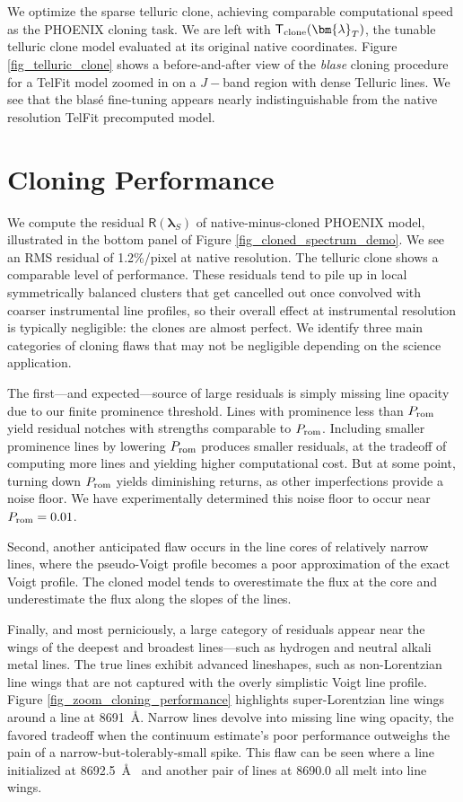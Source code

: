 \documentclass[trackchanges]{aastex631}
\begin{document}
We optimize the sparse telluric clone, achieving comparable computational speed as the PHOENIX cloning task.  We are left with $\mathsf{T}_{\rm clone}(\bm{\lambda}_T)$, the tunable telluric clone model evaluated at its original native coordinates.  Figure \ref{fig_telluric_clone} shows a before-and-after view of the  \emph{blase} cloning procedure for a TelFit model zoomed in on a $J-$band region with dense Telluric lines.  We see that the blas\'e fine-tuning appears nearly indistinguishable from the native resolution TelFit precomputed model.



\section{Cloning Performance}

We compute the residual $\mathsf{R}(\bm{\lambda}_S)$ of native-minus-cloned PHOENIX model, illustrated in the bottom panel of Figure \ref{fig_cloned_spectrum_demo}. We see an RMS residual of 1.2\%/pixel at native resolution.  The telluric clone shows a comparable level of performance.  These residuals tend to pile up in local symmetrically balanced clusters that get cancelled out once convolved with coarser instrumental line profiles, so their overall effect at instrumental resolution is typically negligible: the clones are almost perfect.  We identify three main categories of cloning flaws that may not be negligible depending on the science application.

The first---and expected---source of large residuals is simply missing line opacity due to our finite prominence threshold. Lines with prominence less than $P_{\rm rom}$ yield residual notches with strengths comparable to $P_{\rm rom}$. Including smaller prominence lines by lowering $P_{\rm rom}$ produces smaller residuals, at the tradeoff of computing more lines and yielding higher computational cost.  But at some point, turning down $P_{\rm rom}$ yields diminishing returns, as other imperfections provide a noise floor.  We have experimentally determined this noise floor to occur near $P_{\rm rom}=0.01$.

Second, another anticipated flaw occurs in the line cores of relatively narrow lines, where the pseudo-Voigt profile becomes a poor approximation of the exact Voigt profile.  The cloned model tends to overestimate the flux at the core and underestimate the flux along the slopes of the lines.

Finally, and most perniciously, a large category of residuals appear near the wings of the deepest and broadest lines---such as hydrogen and neutral alkali metal lines.  The true lines exhibit advanced lineshapes, such as non-Lorentzian line wings that are not captured with the overly simplistic Voigt line profile.  Figure \ref{fig_zoom_cloning_performance} highlights super-Lorentzian line wings around a line at 8691~\AA.  Narrow lines devolve into missing line wing opacity, the favored tradeoff when the continuum estimate's poor performance outweighs the pain of a narrow-but-tolerably-small spike. This flaw can be seen where a line initialized at 8692.5~\AA~ and another pair of lines at 8690.0 all melt into line wings.
\end{document}
